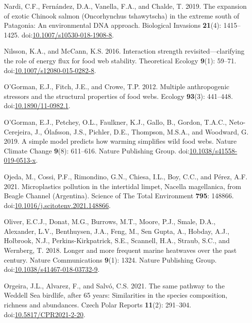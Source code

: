 \documentclass[
]{article}
\newlength{\cslhangindent}
\newenvironment{CSLReferences}[2] %
 {\begin{list}{}{%
  \setlength{\itemindent}{0pt}
  \setlength{\leftmargin}{0pt}
  \setlength{\parsep}{0pt}
  \ifodd #1
   \setlength{\leftmargin}{\cslhangindent}
   \setlength{\itemindent}{-1\cslhangindent}
  \fi
  \setlength{\itemsep}{#2\baselineskip}}}
 {\end{list}}
\begin{document}
\begin{CSLReferences}{1}{0}
Nardi, C.F., Fernández, D.A., Vanella, F.A., and Chalde, T. 2019. The
expansion of exotic {Chinook} salmon ({Oncorhynchus} tshawytscha) in the
extreme south of {Patagonia}: An environmental {DNA} approach.
Biological Invasions \textbf{21}(4): 1415--1425.
doi:\href{https://doi.org/10.1007/s10530-018-1908-8}{10.1007/s10530-018-1908-8}.

Nilsson, K.A., and McCann, K.S. 2016. Interaction strength
revisited---clarifying the role of energy flux for food web stability.
Theoretical Ecology \textbf{9}(1): 59--71.
doi:\href{https://doi.org/10.1007/s12080-015-0282-8}{10.1007/s12080-015-0282-8}.

O'Gorman, E.J., Fitch, J.E., and Crowe, T.P. 2012. Multiple
anthropogenic stressors and the structural properties of food webs.
Ecology \textbf{93}(3): 441--448.
doi:\href{https://doi.org/10.1890/11-0982.1}{10.1890/11-0982.1}.

O'Gorman, E.J., Petchey, O.L., Faulkner, K.J., Gallo, B., Gordon,
T.A.C., Neto-Cerejeira, J., Ólafsson, J.S., Pichler, D.E., Thompson,
M.S.A., and Woodward, G. 2019. A simple model predicts how warming
simplifies wild food webs. Nature Climate Change \textbf{9}(8):
611--616. Nature Publishing Group.
doi:\href{https://doi.org/10.1038/s41558-019-0513-x}{10.1038/s41558-019-0513-x}.

Ojeda, M., Cossi, P.F., Rimondino, G.N., Chiesa, I.L., Boy, C.C., and
Pérez, A.F. 2021. Microplastics pollution in the intertidal limpet,
{Nacella} magellanica, from {Beagle Channel} ({Argentina}). Science of
The Total Environment \textbf{795}: 148866.
doi:\href{https://doi.org/10.1016/j.scitotenv.2021.148866}{10.1016/j.scitotenv.2021.148866}.

Oliver, E.C.J., Donat, M.G., Burrows, M.T., Moore, P.J., Smale, D.A.,
Alexander, L.V., Benthuysen, J.A., Feng, M., Sen Gupta, A., Hobday,
A.J., Holbrook, N.J., Perkins-Kirkpatrick, S.E., Scannell, H.A., Straub,
S.C., and Wernberg, T. 2018. Longer and more frequent marine heatwaves
over the past century. Nature Communications \textbf{9}(1): 1324. Nature
Publishing Group.
doi:\href{https://doi.org/10.1038/s41467-018-03732-9}{10.1038/s41467-018-03732-9}.

Orgeira, J.L., Alvarez, F., and Salvó, C.S. 2021. The same pathway to
the {Weddell Sea} birdlife, after 65 years: Similarities in the species
composition, richness and abundances. Czech Polar Reports
\textbf{11}(2): 291--304.
doi:\href{https://doi.org/10.5817/CPR2021-2-20}{10.5817/CPR2021-2-20}.


\end{CSLReferences}
\end{document}
